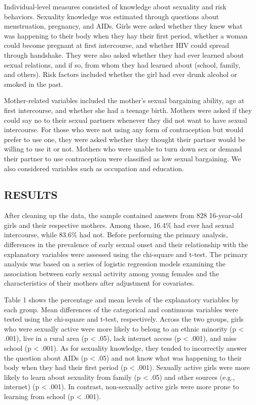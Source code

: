 \documentclass[
]{article}
\begin{document}
Individual-level measures consisted of knowledge about sexuality and
risk behaviors. Sexuality knowledge was estimated through questions
about menstruation, pregnancy, and AIDs. Girls were asked whether they
knew what was happening to their body when they hay their first period,
whether a woman could become pregnant at first intercourse, and whether
HIV could spread through handshake. They were also asked whether they
had ever learned about sexual relations, and if so, from whom they had
learned about (school, family, and others). Risk factors included
whether the girl had ever drunk alcohol or smoked in the past.

Mother-related variables included the mother's sexual bargaining
ability, age at first intercourse, and whether she had a teenage birth.
Mothers were asked if they could say no to their sexual partners
whenever they did not want to have sexual intercourse. For those who
were not using any form of contraception but would prefer to use one,
they were asked whether they thought their partner would be willing to
use it or not. Mothers who were unable to turn down sex or demand their
partner to use contraception were classified as low sexual bargaining.
We also considered variables such as occupation and education.

\hypertarget{results}{%
\subsection{RESULTS}\label{results}}

After cleaning up the data, the sample contained answers from 828
16-year-old girls and their respective mothers. Among those, 16.4\% had
ever had sexual intercourse, while 83.6\% had not. Before performing the
primary analysis, differences in the prevalence of early sexual onset
and their relationship with the explanatory variables were assessed
using the chi-square and t-test. The primary analysis was based on a
series of logistic regression models examining the association between
early sexual activity among young females and the characteristics of
their mothers after adjustment for covariates.

Table 1 shows the percentage and mean levels of the explanatory
variables by each group. Mean differences of the categorical and
continuous variables were tested using the chi-square and t-test,
respectively. Across the two groups, girls who were sexually active were
more likely to belong to an ethnic minority (p \textless{} .001), live
in a rural area (p \textless{} .05), lack internet access (p \textless{}
.001), and miss school (p \textless{} .001). As for sexuality knowledge,
they tended to incorrectly answer the question about AIDs (p \textless{}
.05) and not know what was happening to their body when they had their
first period (p \textless{} .001). Sexually active girls were more
likely to learn about sexuality from family (p \textless{} .05) and
other sources (e.g., internet) (p \textless{} .001). In contrast,
non-sexually active girls were more prone to learning from school (p
\textless{} .001).
\end{document}
